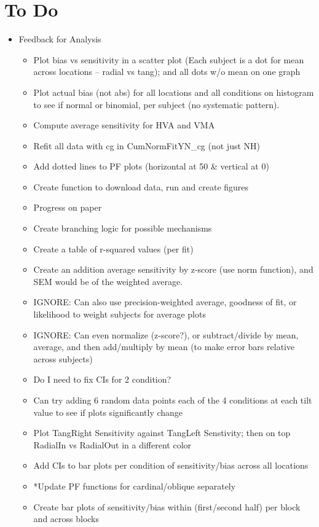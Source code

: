 \documentclass[11pt]{article} %
\begin{document}
\section{To Do} 
\begin{itemize}
\item Feedback for Analysis
	\begin{itemize}
	\item Plot bias vs sensitivity in a scatter plot (Each subject is a dot for mean across locations -- radial vs tang); and all dots w/o mean on one graph
	\item Plot actual bias (not abs) for all locations and all conditions on histogram to see if normal or binomial, per subject (no systematic pattern). 
	\item Compute average sensitivity for HVA and VMA
	\item Refit all data with cg in CumNormFitYN\_cg (not just NH)
	\item Add dotted lines to PF plots (horizontal at 50 \& vertical at 0)
	\item Create function to download data, run and create figures
	\item Progress on paper
	\item Create branching logic for possible mechanisms
	\item Create a table of r-squared values (per fit)
	\item Create an addition average sensitivity by z-score (use norm function), and SEM would be of the weighted average.
	\item IGNORE: Can also use precision-weighted average, goodness of fit, or likelihood to weight subjects for average plots
	\item IGNORE: Can even normalize (z-score?), or subtract/divide by mean, average, and then add/multiply by mean (to make error bars relative across subjects)
	\item Do I need to fix CIs for 2 condition?
	\item Can try adding 6 random data points each of the 4 conditions at each tilt value to see if plots significantly change
	\item Plot TangRight Sensitivity against TangLeft Senstivity; then on top RadialIn vs RadialOut in a different color
	\item Add CIs to bar plots per condition of sensitivity/bias across all locations
	\item *Update PF functions for cardinal/oblique separately
	\item Create bar plots of sensitivity/bias within (first/second half) per block and across blocks

\end{itemize}
\end{itemize}
\end{document}
